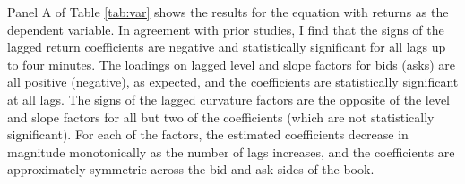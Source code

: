 	Panel A of Table \ref{tab:var} shows the results for the equation with returns as the dependent variable. In agreement with prior studies, I find that the signs of the lagged return coefficients are negative and statistically significant for all lags up to four minutes. The loadings on lagged level and slope factors for bids (asks) are all positive (negative), as expected, and the coefficients are statistically significant at all lags. The signs of the lagged curvature factors are the opposite of the level and slope factors for all but two of the coefficients (which are not statistically significant). For each of the factors, the estimated coefficients decrease in magnitude monotonically as the number of lags increases, and the coefficients are approximately symmetric across the bid and ask sides of the book.

